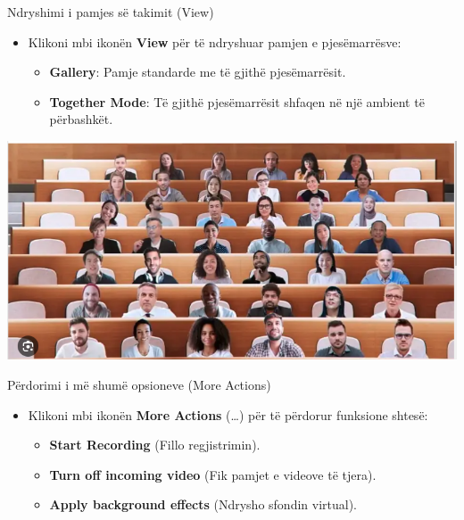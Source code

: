 \documentclass[
  ignorenonframetext,
]{beamer}
\begin{document}
\begin{frame}{Ndryshimi i pamjes së takimit (View)}
\label{ndryshimi-i-pamjes-suxeb-takimit-view}
\begin{itemize}
\item
  Klikoni mbi ikonën \textbf{View} për të ndryshuar pamjen e
  pjesëmarrësve:

  \begin{itemize}
  \item
    \textbf{Gallery}: Pamje standarde me të gjithë pjesëmarrësit.
  \item
    \textbf{Together Mode}: Të gjithë pjesëmarrësit shfaqen në një
    ambient të përbashkët.
  \end{itemize}
\end{itemize}

\includegraphics{./images/teams14.png}
\end{frame}

\begin{frame}{Përdorimi i më shumë opsioneve (More Actions)}
\label{puxebrdorimi-i-muxeb-shumuxeb-opsioneve-more-actions}
\begin{itemize}
\item
  Klikoni mbi ikonën \textbf{More Actions} (\ldots) për të përdorur
  funksione shtesë:

  \begin{itemize}
  \item
    \textbf{Start Recording} (Fillo regjistrimin).
  \item
    \textbf{Turn off incoming video} (Fik pamjet e videove të tjera).
  \item
    \textbf{Apply background effects} (Ndrysho sfondin virtual).
  \end{itemize}
\end{itemize}
\end{frame}
\end{document}
